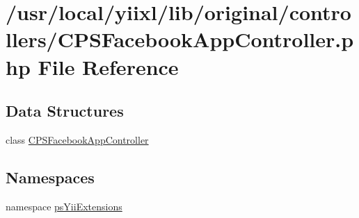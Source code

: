 \hypertarget{CPSFacebookAppController_8php}{
\section{/usr/local/yiixl/lib/original/controllers/CPSFacebookAppController.php File Reference}
\label{CPSFacebookAppController_8php}
}
\subsection*{Data Structures}
\begin{DoxyCompactItemize}
\item 
class \hyperlink{classCPSFacebookAppController}{CPSFacebookAppController}
\end{DoxyCompactItemize}
\subsection*{Namespaces}
\begin{DoxyCompactItemize}
\item 
namespace \hyperlink{namespacepsYiiExtensions}{psYiiExtensions}
\end{DoxyCompactItemize}
